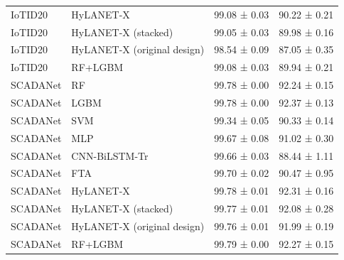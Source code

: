 \begin{tabular}{llll}
IoTID20 & HyLANET-X & 99.08 ± 0.03 & 90.22 ± 0.21 \\
IoTID20 & HyLANET-X (stacked) & 99.05 ± 0.03 & 89.98 ± 0.16 \\
IoTID20 & HyLANET-X (original design) & 98.54 ± 0.09 & 87.05 ± 0.35 \\
IoTID20 & RF+LGBM & 99.08 ± 0.03 & 89.94 ± 0.21 \\
SCADANet & RF & 99.78 ± 0.00 & 92.24 ± 0.15 \\
SCADANet & LGBM & 99.78 ± 0.00 & 92.37 ± 0.13 \\
SCADANet & SVM & 99.34 ± 0.05 & 90.33 ± 0.14 \\
SCADANet & MLP & 99.67 ± 0.08 & 91.02 ± 0.30 \\
SCADANet & CNN-BiLSTM-Tr & 99.66 ± 0.03 & 88.44 ± 1.11 \\
SCADANet & FTA & 99.70 ± 0.02 & 90.47 ± 0.95 \\
SCADANet & HyLANET-X & 99.78 ± 0.01 & 92.31 ± 0.16 \\
SCADANet & HyLANET-X (stacked) & 99.77 ± 0.01 & 92.08 ± 0.28 \\
SCADANet & HyLANET-X (original design) & 99.76 ± 0.01 & 91.99 ± 0.19 \\
SCADANet & RF+LGBM & 99.79 ± 0.00 & 92.27 ± 0.15 \\
\bottomrule
\end{tabular}
